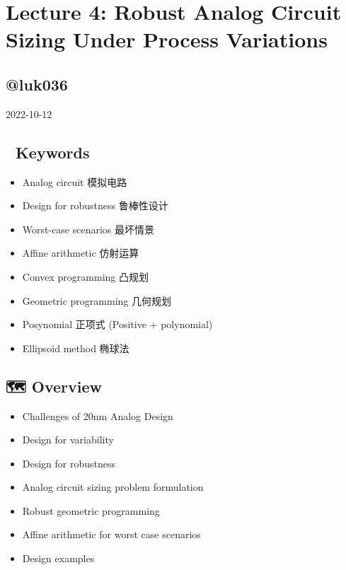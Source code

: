 \documentclass[
]{article}
\author{}
\date{}
\providecommand{\tightlist}{%
  \setlength{\itemsep}{0pt}\setlength{\parskip}{0pt}}
\begin{document}
\hypertarget{lecture-4-robust-analog-circuit-sizing-under-process-variations}{%
\section{Lecture 4: Robust Analog Circuit Sizing Under Process Variations}\label{lecture-4-robust-analog-circuit-sizing-under-process-variations}}

\hypertarget{luk036}{%
\subsection{@luk036}\label{luk036}}

2022-10-12

\hypertarget{keywords}{%
\subsection{🔑 Keywords}\label{keywords}}

\begin{itemize}
\tightlist
\item
  Analog circuit 模拟电路
\item
  Design for robustness 鲁棒性设计
\item
  Worst-case scenarios 最坏情景
\item
  Affine arithmetic 仿射运算
\item
  Convex programming 凸规划
\item
  Geometric programming 几何规划
\item
  Posynomial 正项式 (Positive + polynomial)
\item
  Ellipsoid method 椭球法
\end{itemize}

\hypertarget{overview}{%
\subsection{🗺️ Overview}\label{overview}}

\begin{itemize}
\item
  Challenges of 20nm Analog Design
\item
  Design for variability
\item
  Design for robustness
\item
  Analog circuit sizing problem formulation
\item
  Robust geometric programming
\item
  Affine arithmetic for worst case scenarios
\item
  Design examples
\end{itemize}
\end{document}
